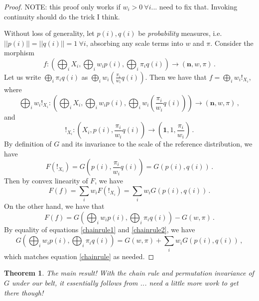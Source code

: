 \documentclass{article}
\newtheorem{theorem}{Theorem}
\begin{document}
\begin{proof}
    NOTE: this proof only works if $w_i > 0 \ \forall i$... need to fix that. Invoking continuity should do the trick I think.
    
    Without loss of generality, let $p(i), q(i)$ be \textit{probability} measures, i.e. $||p(i)|| = ||q(i)|| = 1 \ \forall i$, absorbing any scale terms into $w$ and $\pi$. Consider the morphism
    $$
        f:\left(\bigoplus_i X_i, \bigoplus_i w_i p(i), \bigoplus_i \pi_i q(i)\right) \rightarrow (\mathbf{n}, w, \pi)\,.
    $$
    Let us write $\bigoplus_i \pi_i q(i)$ as $\bigoplus_i w_i (\frac{\pi_i}{w_i} q(i))$. Then we have that $f = \bigoplus_i w_i !_{X_i}$, where
    $$
        \bigoplus_i w_i !_{X_i}: \left(\bigoplus_i X_i, \bigoplus_i w_i p(i), \bigoplus_i w_i \left(\frac{\pi_i}{w_i} q(i)\right)\right) \rightarrow (\mathbf{n}, w, \pi)\,,
    $$
    and
    $$
        !_{X_i}: \left(X_i, p(i), \frac{\pi_i}{w_i}q(i)\right) \rightarrow \left(\mathbf{1}, 1, \frac{\pi_i}{w_i}\right)\,.
    $$
    By definition of $G$ and its invariance to the scale of the reference distribution, we have
    $$
        F(!_{X_i}) = G(p(i), \frac{\pi_i}{w_i}q(i)) = G(p(i), q(i))\,.
    $$
    Then by convex linearity of $F$, we have
    \begin{equation} \label{chainrule1}
        F(f) = \sum_i w_i F(!_{X_i}) = \sum_i w_i G(p(i), q(i))\,.
    \end{equation}
    On the other hand, we have that 
    \begin{equation} \label{chainrule2}
        F(f) = G\left(\bigoplus_i w_i p(i), \bigoplus_i \pi_i q(i)\right) - G(w, \pi)\,.
    \end{equation}
    By equality of equations \eqref{chainrule1} and \eqref{chainrule2}, we have 
    \begin{equation*}
        G\left(\bigoplus_i w_i p(i), \bigoplus_i \pi_i q(i)\right) = G(w, \pi) +  \sum_i w_i G(p(i), q(i))\,,
    \end{equation*}
    which matches equation \eqref{chainrule} as needed.
\end{proof}

\begin{theorem}
    The main result! With the chain rule and permutation invariance of $G$ under our belt, it essentially follows from \cite{leinsterShortCharacterizationRelative2017}... need a little more work to get there though!
\end{theorem}

\printbibliography
\end{document}
